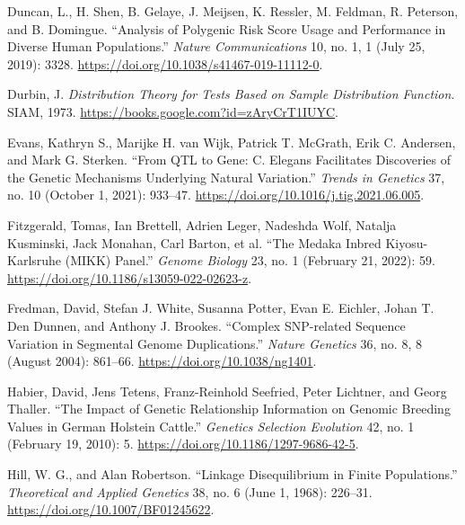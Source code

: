 \documentclass[
  9pt,
]{book}
\newlength{\cslhangindent}
\newlength{\cslentryspacingunit} %
\newenvironment{CSLReferences}[2] %
 {%
  \setlength{\parindent}{0pt}
  \ifodd #1
  \let\oldpar\par
  \def\par{\hangindent=\cslhangindent\oldpar}
  \fi
  \setlength{\parskip}{#2\cslentryspacingunit}
 }%
 {}
\begin{document}
\begin{CSLReferences}{1}{0}
\leavevmode{}%
Duncan, L., H. Shen, B. Gelaye, J. Meijsen, K. Ressler, M. Feldman, R. Peterson, and B. Domingue. {``Analysis of Polygenic Risk Score Usage and Performance in Diverse Human Populations.''} \emph{Nature Communications} 10, no. 1, 1 (July 25, 2019): 3328. \url{https://doi.org/10.1038/s41467-019-11112-0}.

\leavevmode{}%
Durbin, J. \emph{Distribution {Theory} for {Tests Based} on {Sample Distribution Function}}. {SIAM}, 1973. \url{https://books.google.com?id=zAryCrT1IUYC}.

\leavevmode{}%
Evans, Kathryn S., Marijke H. van Wijk, Patrick T. McGrath, Erik C. Andersen, and Mark G. Sterken. {``From {QTL} to Gene: {C}. Elegans Facilitates Discoveries of the Genetic Mechanisms Underlying Natural Variation.''} \emph{Trends in Genetics} 37, no. 10 (October 1, 2021): 933--47. \url{https://doi.org/10.1016/j.tig.2021.06.005}.

\leavevmode{}%
Fitzgerald, Tomas, Ian Brettell, Adrien Leger, Nadeshda Wolf, Natalja Kusminski, Jack Monahan, Carl Barton, et al. {``The {Medaka Inbred Kiyosu-Karlsruhe} ({MIKK}) Panel.''} \emph{Genome Biology} 23, no. 1 (February 21, 2022): 59. \url{https://doi.org/10.1186/s13059-022-02623-z}.

\leavevmode{}%
Fredman, David, Stefan J. White, Susanna Potter, Evan E. Eichler, Johan T. Den Dunnen, and Anthony J. Brookes. {``Complex {SNP-related} Sequence Variation in Segmental Genome Duplications.''} \emph{Nature Genetics} 36, no. 8, 8 (August 2004): 861--66. \url{https://doi.org/10.1038/ng1401}.

\leavevmode{}%
Habier, David, Jens Tetens, Franz-Reinhold Seefried, Peter Lichtner, and Georg Thaller. {``The Impact of Genetic Relationship Information on Genomic Breeding Values in {German Holstein} Cattle.''} \emph{Genetics Selection Evolution} 42, no. 1 (February 19, 2010): 5. \url{https://doi.org/10.1186/1297-9686-42-5}.

\leavevmode{}%
Hill, W. G., and Alan Robertson. {``Linkage Disequilibrium in Finite Populations.''} \emph{Theoretical and Applied Genetics} 38, no. 6 (June 1, 1968): 226--31. \url{https://doi.org/10.1007/BF01245622}.


\end{CSLReferences}
\end{document}
